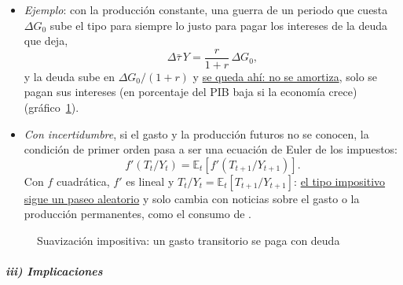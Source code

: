 \documentclass[11pt]{article}
\begin{document}
\begin{itemize}
\begin{itemize}
\begin{equation*}
    D_t-D_{t-1}=\underbrace{(G_t-G^P)}_{\text{gasto transitorio}}+\underbrace{\bar\tau\,(Y^P-Y_t)}_{\text{producción transitoria}},
    \end{equation*}
    con los valores permanentes calculados desde cada $t$. \uline{Hay déficit cuando el gasto está por encima de su nivel permanente o la producción por debajo del suyo}, y superávit en el caso contrario.
  \end{itemize}
\item \emph{Ejemplo}: con la producción constante, una guerra de un periodo que cuesta $\Delta G_0$ sube el tipo para siempre lo justo para pagar los intereses de la deuda que deja,
  \begin{equation*}
  \Delta\bar\tau\,Y=\frac{r}{1+r}\,\Delta G_0,
  \end{equation*}
  y la deuda sube en $\Delta G_0/(1+r)$ y \uline{se queda ahí: no se amortiza}, solo se pagan sus intereses (en porcentaje del PIB baja si la economía crece) (gráfico~\ref{fig:suavizacion}).
\item \emph{Con incertidumbre}, si el gasto y la producción futuros no se conocen, la condición de primer orden pasa a ser una ecuación de Euler de los impuestos:
  \begin{equation*}
  f'(T_t/Y_t)=\mathbb{E}_t\left[f'(T_{t+1}/Y_{t+1})\right].
  \end{equation*}
  Con $f$ cuadrática, $f'$ es lineal y $T_t/Y_t=\mathbb{E}_t[T_{t+1}/Y_{t+1}]$: \uline{el tipo impositivo sigue un paseo aleatorio} y solo cambia con noticias sobre el gasto o la producción permanentes, como el consumo de  .
\end{itemize}

\begin{figure}[H]
\centering
\caption{Suavización impositiva: un gasto transitorio se paga con deuda}\label{fig:suavizacion}
\end{figure}

\subparagraph{iii) Implicaciones}
\end{document}

